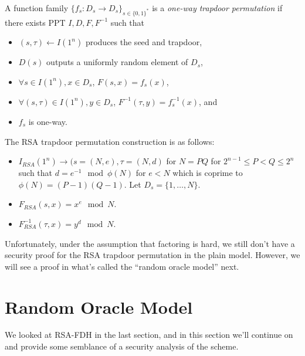 \begin{definition} 
A function family $\{f_s: D_s \to D_s\}_{s \in \{0,1\}^*}$ is a \emph{one-way trapdoor permutation} if there exists PPT $I, D, F, F^{-1}$ such that 
\begin{itemize}
    \item $(s, \tau) \leftarrow I(1^n)$ produces the seed and trapdoor, 
    
    \item $D(s)$ outputs a uniformly random element of $D_s$, 

    \item $\forall s \in I(1^n), x \in D_s$, $F(s, x) = f_s(x)$, 

    \item $\forall (s, \tau) \in I(1^n), y \in D_s$, $F^{-1}(\tau, y) = f_s^{-1}(x)$, and 

    \item $f_s$ is one-way. 
\end{itemize}
\end{definition} 

The RSA trapdoor permutation construction is as follows: 
\begin{itemize} 
    
    \item $I_{RSA}(1^n) \rightarrow (s = (N, e), \tau = (N, d)$ for $N = PQ$ for $2^{n-1} \leq P < Q \leq 2^n$ such that $d = e^{-1} \mod \phi(N)$ for $e < N$ which is coprime to $\phi(N) = (P-1)(Q-1)$.
    Let $D_s = \{1, \ldots, N\}$. 

    \item $F_{RSA}(s, x) = x^e \mod N$. 

    \item $F_{RSA}^{-1}(\tau, x) = y^d \mod N$. 
\end{itemize}
Unfortunately, under the assumption that factoring is hard, we still don't have a security proof for the RSA trapdoor permutation in the plain model. 
However, we will see a proof in what's called the ``random oracle model'' next. 





\section{Random Oracle Model}

We looked at RSA-FDH in the last section, and in this section we'll continue on and provide some semblance of a security analysis of the scheme.

